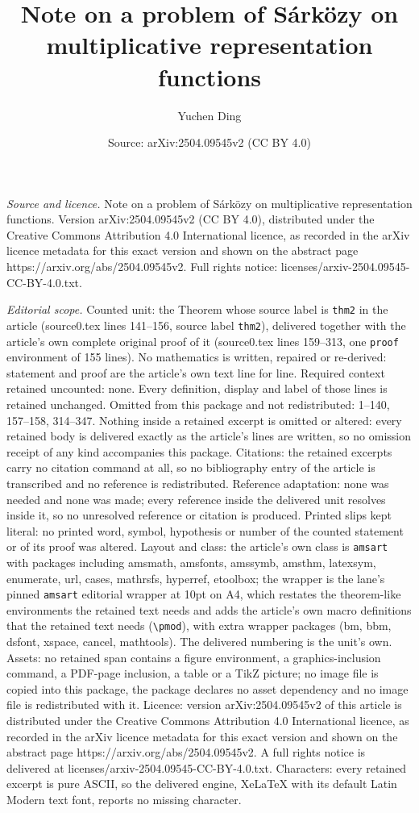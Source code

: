 \documentclass[10pt,a4paper]{amsart}
\title[Note on a problem of S\'ark\"ozy on multiplicative represent]{Note on a problem of S\'ark\"ozy on multiplicative representation functions}
\author{Yuchen Ding}
\date{Source: arXiv:2504.09545v2 (CC BY 4.0)}
\begin{document}
\maketitle

\noindent\emph{Source and licence.} Note on a problem of S\'ark\"ozy on multiplicative representation functions. Version arXiv:2504.09545v2 (CC BY 4.0), distributed under the Creative Commons Attribution 4.0 International licence, as recorded in the arXiv licence metadata for this exact version and shown on the abstract page https://arxiv.org/abs/2504.09545v2. Full rights notice: licenses/arxiv-2504.09545-CC-BY-4.0.txt.\par\smallskip

\noindent\textit{Editorial scope.} Counted unit: the Theorem whose source label is \texttt{thm2} in the article (source0.tex lines 141--156, source label \texttt{thm2}), delivered together with the article's own complete original proof of it (source0.tex lines 159--313, one \texttt{proof} environment of 155 lines). No mathematics is written, repaired or re-derived: statement and proof are the article's own text line for line. Required context retained uncounted: none. Every definition, display and label of those lines is retained unchanged. Omitted from this package and not redistributed: 1--140, 157--158, 314--347. Nothing inside a retained excerpt is omitted or altered: every retained body is delivered exactly as the article's lines are written, so no omission receipt of any kind accompanies this package. Citations: the retained excerpts carry no citation command at all, so no bibliography entry of the article is transcribed and no reference is redistributed. Reference adaptation: none was needed and none was made; every reference inside the delivered unit resolves inside it, so no unresolved reference or citation is produced. Printed slips kept literal: no printed word, symbol, hypothesis or number of the counted statement or of its proof was altered. Layout and class: the article's own class is \texttt{amsart} with packages including amsmath, amsfonts, amssymb, amsthm, latexsym, enumerate, url, cases, mathrsfs, hyperref, etoolbox; the wrapper is the lane's pinned \texttt{amsart} editorial wrapper at 10pt on A4, which restates the theorem-like environments the retained text needs and adds the article's own macro definitions that the retained text needs (\texttt{\textbackslash pmod}), with extra wrapper packages (bm, bbm, dsfont, xspace, cancel, mathtools). The delivered numbering is the unit's own. Assets: no retained span contains a figure environment, a graphics-inclusion command, a PDF-page inclusion, a table or a TikZ picture; no image file is copied into this package, the package declares no asset dependency and no image file is redistributed with it. Licence: version arXiv:2504.09545v2 of this article is distributed under the Creative Commons Attribution 4.0 International licence, as recorded in the arXiv licence metadata for this exact version and shown on the abstract page https://arxiv.org/abs/2504.09545v2. A full rights notice is delivered at licenses/arxiv-2504.09545-CC-BY-4.0.txt. Characters: every retained excerpt is pure ASCII, so the delivered engine, XeLaTeX with its default Latin Modern text font, reports no missing character.
\end{document}
